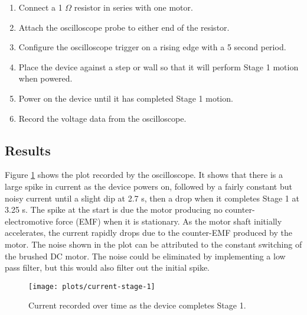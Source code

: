\begin{enumerate}
	\item Connect a 1 $\Omega$ resistor in series with one motor.
	\item Attach the oscilloscope probe to either end of the resistor.
	\item Configure the oscilloscope trigger on a rising edge with a 5 second period.
	\item Place the device against a step or wall so that it will perform Stage 1 motion when powered.
	\item Power on the device until it has completed Stage 1 motion.
	\item Record the voltage data from the oscilloscope.
\end{enumerate}

\subsection{Results}

Figure \ref{fig:current-stage-1} shows the plot recorded by the oscilloscope. It shows that there is a large spike in current as the device powers on, followed by a fairly constant but noisy current until a slight dip at 2.7 s, then a drop when it completes Stage 1 at 3.25 s. The spike at the start is due the motor producing no counter-electromotive force (EMF) when it is stationary. As the motor shaft initially accelerates, the current rapidly drops due to the counter-EMF produced by the motor. The noise shown in the plot can be attributed to the constant switching of the brushed DC motor. The noise could be eliminated by implementing a low pass filter, but this would also filter out the initial spike. 
\begin{figure}[h]
	\centering
	\texttt{[image: plots/current-stage-1]}
	\caption{Current recorded over time as the device completes Stage 1.}
	\label{fig:current-stage-1}
\end{figure}
